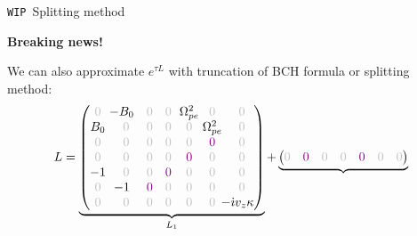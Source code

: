 \documentclass{beamer}
\newcommand{\mbold}[1]{{\textbf{\color{PLB}#1}}}
\newcommand{\I}{\dot{\imath}}
\begin{document}
\begin{frame}{{\small\texttt{WIP}\ }Splitting method}
  \vspace{-2cm}\hfill\begin{turn}{-30}{\large\mbold{\textcolor{mred}{Breaking news!}}}\end{turn}

  We can also approximate $e^{\tau L}$ with truncation of BCH formula or splitting method:
  $$
    L = \underbrace{\begin{pmatrix}
      \gz & \hspace{-0.25cm}-B_0 & \gz                   & \gz                   & \hspace{-0.125cm}\Omega_{pe}^2\hspace{-0.125cm} &                  \gz                            & \gz \\ 
      B_0 &                  \gz & \gz                   & \gz                   &                  \gz                            & \hspace{-0.125cm}\Omega_{pe}^2\hspace{-0.125cm} & \gz \\
      \gz &                  \gz & \gz                   & \gz                   &                  \gz                            &                  \textcolor{violet}{0}          & \gz \\ 
      \gz &                  \gz & \gz                   & \gz                   &                  \textcolor{violet}{0}          &                  \gz                            & \gz \\ 
      -1  &                  \gz & \gz                   & \textcolor{violet}{0} &                  \gz                            &                  \gz                            & \gz \\ 
      \gz & \hspace{-0.25cm}-1   & \textcolor{violet}{0} & \gz                   &                  \gz                            &                  \gz                            & \gz \\ 
      \gz &                  \gz & \gz                   & \gz                   &                  \gz                            &                  \gz                            & \hspace{-0.25cm}-\I v_z\kappa \\ 
    \end{pmatrix}}_{L_1}
    +
    \underbrace{\begin{pmatrix}
      \gz & \textcolor{violet}{0} & \gz                      &  \gz                      &  \textcolor{violet}{0}            & \gz                      & \gz \\ 

\end{pmatrix}}$$
\end{frame}
\end{document}
